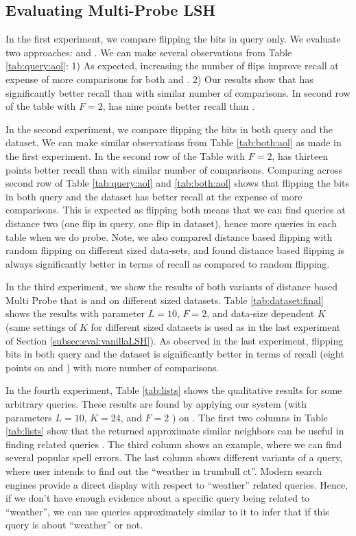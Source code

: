 \subsection{Evaluating Multi-Probe LSH}
\label{subsec:eval:multiProbeLSH}
In the first experiment, we compare flipping the bits in query only. We evaluate two approaches: \rflipq and \dflipq. We can make several observations from Table \ref{tab:query:aol}: 1) As expected, increasing the number of flips improve recall at expense of more comparisons for both \dflipq and \rflipq. 2) Our results show that \dflipq has significantly better recall than \rflipq with similar number of comparisons. In second row of the table with $F=2$, \dflipq has nine points better recall than \rflipq.  

In the second experiment, we compare flipping the bits in both query and the dataset. We can make similar observations from Table \ref{tab:both:aol} as made in the first experiment. In the second row of the Table with $F=2$, \dflipb has thirteen points better recall than \rflipb with similar number of comparisons. Comparing across second row of  Table \ref{tab:query:aol} and \ref{tab:both:aol} shows that flipping the bits in both query and the dataset has better recall at the expense of more comparisons. This is expected as flipping both means that we can find queries at distance two (one flip in query, one flip in dataset), hence more queries in each table when we do probe. Note, we also compared distance based flipping with random flipping on different sized data-sets, and found distance based flipping is always significantly better in terms of recall as compared to random flipping. 

In the third experiment, we show the results of both variants of distance based Multi Probe that is \dflipq and \dflipb on different sized datasets. Table \ref{tab:dataset:final} shows the results with parameter $L=10$, $F=2$, and data-size dependent $K$ (same settings of $K$ for different sized datasets is used as in the last experiment of Section \ref{subsec:eval:vanillaLSH}). As observed in the last experiment, flipping bits in both query and the dataset is significantly better in terms of recall (eight points on \dataA and \dataB) with more number of comparisons. 

In the fourth experiment, Table \ref{tab:lists} shows the qualitative results for some arbitrary queries. These results are found by applying our system (\dflipb with parameters $L=10$, $K=24$, and $F=2$ ) on \dataC. The first two columns in Table \ref{tab:lists} show that the returned approximate similar neighbors can be useful in finding related queries \cite{Jones06WWW,Jain11SIGIR}. The third column shows an example, where we can find several popular spell errors. The last column shows different variants of a query, where user intends to find out the ``weather in trumbull ct''. Modern search engines provide a direct display with respect to ``weather'' related queries. Hence, if we don't have enough evidence about a specific query being related to ``weather'', we can use queries approximately similar to it to infer that if this query is about ``weather'' or not.  

